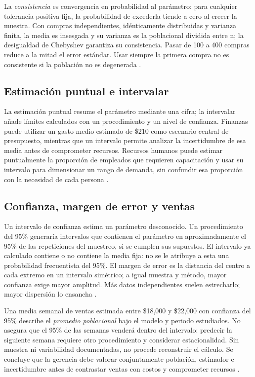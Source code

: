 {\clearpage
La \textit{consistencia} es convergencia en probabilidad al parámetro: para cualquier tolerancia positiva fija, la probabilidad de excederla tiende a cero al crecer la muestra. Con compras independientes, idénticamente distribuidas y varianza finita, la media es insesgada y su varianza es la poblacional dividida entre n; la desigualdad de Chebyshev garantiza su consistencia. Pasar de 100 a 400 compras reduce a la mitad el error estándar. Usar siempre la primera compra no es consistente si la población no es degenerada \citep[sec. 9.3]{wackerly2010}.

\subsection{Estimación puntual e intervalar}
La estimación puntual resume el parámetro mediante una cifra; la intervalar añade límites calculados con un procedimiento y un nivel de confianza. Finanzas puede utilizar un gasto medio estimado de \$210 como escenario central de presupuesto, mientras que un intervalo permite analizar la incertidumbre de esa media antes de comprometer recursos. Recursos humanos puede estimar puntualmente la proporción de empleados que requieren capacitación y usar su intervalo para dimensionar un rango de demanda, sin confundir esa proporción con la necesidad de cada persona \citep{holmesBusiness2023}.

\subsection{Confianza, margen de error y ventas}
Un intervalo de confianza estima un parámetro desconocido. Un procedimiento del 95\% generaría intervalos que contienen el parámetro en aproximadamente el 95\% de las repeticiones del muestreo, si se cumplen sus supuestos. El intervalo ya calculado contiene o no contiene la media fija: no se le atribuye a esta una probabilidad frecuentista del 95\%. El margen de error es la distancia del centro a cada extremo en un intervalo simétrico; a igual muestra y método, mayor confianza exige mayor amplitud. Más datos independientes suelen estrecharlo; mayor dispersión lo ensancha \citep{nistHandbook}.

Una media semanal de ventas estimada entre \$18,000 y \$22,000 con confianza del 95\% describe el \textit{promedio poblacional} bajo el modelo y periodo estudiados. No asegura que el 95\% de las semanas venderá dentro del intervalo: predecir la siguiente semana requiere otro procedimiento y considerar estacionalidad. Sin muestra ni variabilidad documentadas, no procede reconstruir el cálculo. Se concluye que la gerencia debe valorar conjuntamente población, estimador e incertidumbre antes de contrastar ventas con costos y comprometer recursos \citep{nistHandbook}.

}
